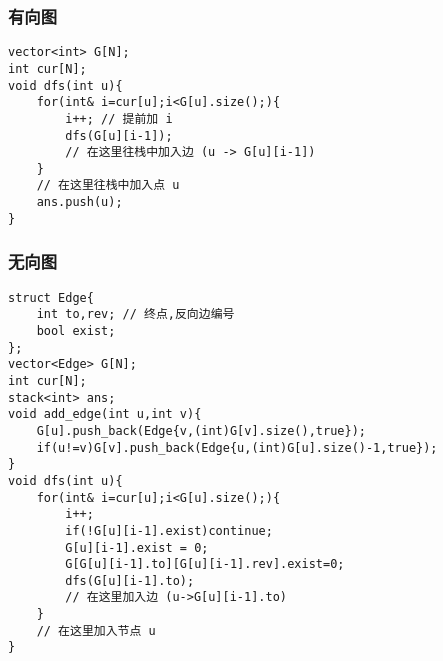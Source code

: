 \subsubsection{有向图}
\begin{verbatim}
vector<int> G[N];
int cur[N];
void dfs(int u){
    for(int& i=cur[u];i<G[u].size();){ 
        i++; // 提前加 i
        dfs(G[u][i-1]); 
        // 在这里往栈中加入边 (u -> G[u][i-1])
    }
    // 在这里往栈中加入点 u
    ans.push(u);
}    
\end{verbatim}
\subsubsection{无向图}
\begin{verbatim}
struct Edge{
    int to,rev; // 终点,反向边编号
    bool exist;
};
vector<Edge> G[N];
int cur[N];
stack<int> ans;
void add_edge(int u,int v){
    G[u].push_back(Edge{v,(int)G[v].size(),true});
    if(u!=v)G[v].push_back(Edge{u,(int)G[u].size()-1,true});
}
void dfs(int u){
    for(int& i=cur[u];i<G[u].size();){
        i++;
        if(!G[u][i-1].exist)continue;
        G[u][i-1].exist = 0;
        G[G[u][i-1].to][G[u][i-1].rev].exist=0;
        dfs(G[u][i-1].to);
        // 在这里加入边 (u->G[u][i-1].to)
    }
    // 在这里加入节点 u
}
\end{verbatim}